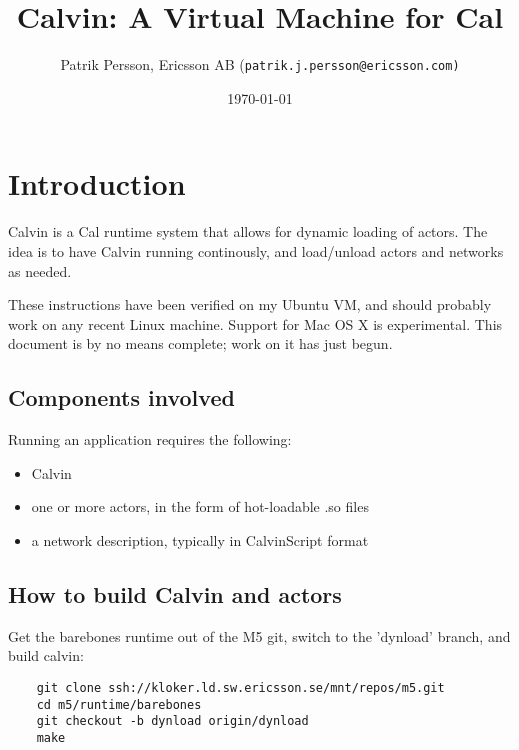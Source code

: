 \documentclass[10pt, a4paper]{article}
\title{Calvin: A Virtual Machine for Cal}
\author{Patrik Persson, Ericsson AB (\texttt{patrik.j.persson@ericsson.com)}}
\date{\today}
\begin{document}
\maketitle

\vfill

\tableofcontents

\vfill

\newpage

\section{Introduction}

\label{QuickIntro}

Calvin is a Cal runtime system that allows for dynamic loading of
actors. The idea is to have Calvin running continously, and
load/unload actors and networks as needed.

\vspace{5mm}\noindent%
These instructions have been verified on my
Ubuntu VM, and should probably work on any recent Linux
machine. Support for Mac OS X is experimental. This document is by no
means complete; work on it has just begun.

\subsection{Components involved}

Running an application requires the following:

\begin{itemize}
\item Calvin
\item one or more actors, in the form of hot-loadable .so files
\item a network description, typically in CalvinScript format
\end{itemize}

\subsection{How to build Calvin and actors}

Get the barebones runtime out of the M5 git, switch to the
   'dynload' branch, and build calvin:

\begin{verbatim}
    git clone ssh://kloker.ld.sw.ericsson.se/mnt/repos/m5.git
    cd m5/runtime/barebones
    git checkout -b dynload origin/dynload
    make
\end{verbatim}
\end{document}
